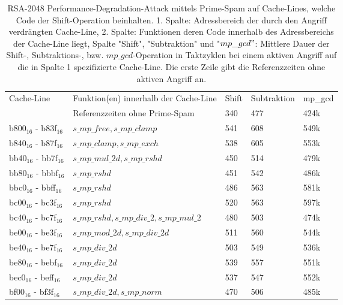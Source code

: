 \begin{table}[h]
\label{tbl:PerformanceDegShift}
\caption{RSA-2048 Performance-Degradation-Attack mittels Prime-Spam auf Cache-Lines, welche Code der Shift-Operation beinhalten. 1. Spalte: Adressbereich der durch den Angriff verdrängten Cache-Line, 2. Spalte: Funktionen deren Code innerhalb des Adressbereichs der Cache-Line liegt, Spalte "Shift", "Subtraktion" und "$mp\_gcd"$: Mittlere Dauer der Shift-, Subtraktions-, bzw. $mp\_gcd$-Operation in Taktzyklen bei einem aktiven Angriff auf die in Spalte 1 spezifizierte Cache-Line. Die erste Zeile gibt die Referenzzeiten ohne aktiven Angriff an. }
\begin{tabular}{lllll}
Cache-Line  & Funktion(en) innerhalb der Cache-Line                                  & Shift & Subtraktion & mp\_gcd \\
&Referenzzeiten ohne Prime-Spam                                         & 340   & 477         & 424k    \\
b800$_{16}$ - b83f$_{16}$ & $s\_mp\_free, s\_mp\_clamp$                 & 541   & 608         & 549k    \\
b840$_{16}$ - b87f$_{16}$ & $s\_mp\_clamp, s\_mp\_exch$                 & 538   & 605         & 553k    \\
bb40$_{16}$ - bb7f$_{16}$ & $s\_mp\_mul\_2d, s\_mp\_rshd$               & 450   & 514         & 479k    \\
bb80$_{16}$ - bbbf$_{16}$ & $s\_mp\_rshd$                               & 451   & 542         & 486k    \\
bbc0$_{16}$ - bbff$_{16}$ & $s\_mp\_rshd$                               & 486   & 563         & 581k    \\
bc00$_{16}$ - bc3f$_{16}$ & $s\_mp\_rshd$                               & 520   & 563         & 597k    \\
bc40$_{16}$ - bc7f$_{16}$ & $s\_mp\_rshd, s\_mp\_div\_2, s\_mp\_mul\_2$ & 480   & 503         & 474k    \\
be00$_{16}$ - be3f$_{16}$ & $s\_mp\_mod\_2d, s\_mp\_div\_2d$            & 511   & 560         & 544k    \\
be40$_{16}$ - be7f$_{16}$ & $s\_mp\_div\_2d$                            & 503   & 549         & 536k    \\
be80$_{16}$ - bebf$_{16}$ & $s\_mp\_div\_2d$                            & 539   & 557         & 551k    \\
bec0$_{16}$ - beff$_{16}$ & $s\_mp\_div\_2d$                            & 537   & 547         & 552k    \\
bf00$_{16}$ - bf3f$_{16}$ & $s\_mp\_div\_2d, s\_mp\_norm$               & 470   & 506         & 485k   
\end{tabular}
\end{table}

